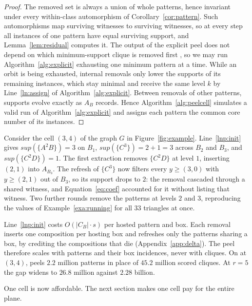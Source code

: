 \begin{proof}
The removed set is always a union of whole patterns, hence invariant under every within-class automorphism of Corollary~\ref{cor:pattern}.
%
Such automorphisms map surviving witnesses to surviving witnesses, so at every step all instances of one pattern have equal surviving support, and Lemma~\ref{lem:residual} computes it.
%
The output of the explicit peel does not depend on which minimum-support clique is removed first \cite{firstNucleus}, so we may run Algorithm~\ref{alg:explicit} exhausting one minimum pattern at a time.
%
While an orbit is being exhausted, internal removals only lower the supports of its remaining instances, which stay minimal and receive the same level $k$ by Line~\ref{ln:assign} of Algorithm~\ref{alg:explicit}.
%
Between removals of other patterns, supports evolve exactly as $A_B$ records.
%
Hence Algorithm~\ref{alg:peelcell} simulates a valid run of Algorithm~\ref{alg:explicit} and assigns each pattern the common core number of its instances.
\end{proof}

\begin{example}\label{exa:peel}
Consider the cell $(3,4)$ of the graph $G$ in Figure~\ref{fig:example}.
%
Line~\ref{lnp:init} gives $sup(\{A^2B\})=3$ on $B_1$, $sup(\{C^3\})=2+1=3$ across $B_2$ and $B_3$, and $sup(\{C^2D\})=1$.
%
The first extraction removes $\{C^2D\}$ at level $1$, inserting $(2,1)$ into $A_{B_3}$.
%
The refresh of $\{C^3\}$ now filters every $y\ge(3,0)$ with $y\ge(2,1)$ out of $B_3$, so its support drops to $2$: the removal cascaded through a shared witness, and Equation~\eqref{eq:coef} accounted for it without listing that witness.
%
Two further rounds remove the patterns at levels $2$ and $3$, reproducing the values of Example~\ref{exa:running} for all $33$ triangles at once.
\end{example}

Line~\ref{lnp:init} costs $O(|C_B|\cdot s)$ per hosted pattern and box.
%
Each removal inserts one composition per hosting box and refreshes only the patterns sharing a box, by crediting the compositions that die (Appendix~\ref{app:delta}).
%
The peel therefore scales with patterns and their box incidences, never with cliques.
%
On \pkustk{} at $(3,4)$, \peelcell{} peels $2.2$ million patterns in place of $45.2$ million scored cliques.
%
At $r=5$ the gap widens to $26.8$ million against $2.28$ billion.

One cell is now affordable.
%
The next section makes one cell pay for the entire plane.
